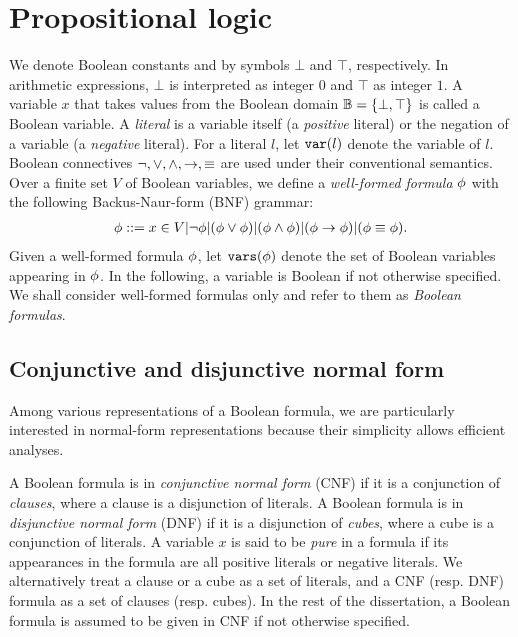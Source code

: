 \section{Propositional logic}
\label{sect:propositional-logic}

We denote Boolean constants \false and \true by symbols $\bot$ and $\top$, respectively.
In arithmetic expressions, $\bot$ is interpreted as integer $0$ and $\top$ as integer $1$.
A variable $x$ that takes values from the Boolean domain $\mathbb{B}=\{\bot,\top\}$ is called a Boolean variable.
A \textit{literal} is a variable itself (a \textit{positive} literal) or the negation of a variable (a \textit{negative} literal).
For a literal $l$, let $\mathtt{var}(l)$ denote the variable of $l$.
Boolean connectives $\lnot, \lor, \land, \rightarrow, \equiv$ are used under their conventional semantics.
Over a finite set $V$ of Boolean variables,
we define a \textit{well-formed formula} $\phi$ with the following Backus-Naur-form (BNF) grammar:
\begin{align}
    \phi ::= x\in V | \lnot\phi | (\phi\lor\phi) | (\phi\land\phi) | (\phi\rightarrow\phi) | (\phi\equiv\phi).
\end{align}
Given a well-formed formula $\phi$, let $\mathtt{vars}(\phi)$ denote the set of Boolean variables appearing in $\phi$.
In the following, a variable is Boolean if not otherwise specified.
We shall consider well-formed formulas only and refer to them as \textit{Boolean formulas}.

\subsection{Conjunctive and disjunctive normal form}
Among various representations of a Boolean formula,
we are particularly interested in normal-form representations because their simplicity allows efficient analyses.

A Boolean formula is in \textit{conjunctive normal form} (CNF) if it is a conjunction of \textit{clauses},
where a clause is a disjunction of literals.
A Boolean formula is in \textit{disjunctive normal form} (DNF) if it is a disjunction of \textit{cubes},
where a cube is a conjunction of literals.
A variable $x$ is said to be \textit{pure} in a formula if its appearances in the formula are all positive literals or negative literals.
We alternatively treat a clause or a cube as a set of literals,
and a CNF (resp. DNF) formula as a set of clauses (resp. cubes).
In the rest of the dissertation, a Boolean formula is assumed to be given in CNF if not otherwise specified.

